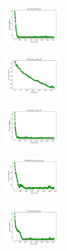 \begin{figure}[H]
    \centering
    \begin{subfigure}
        \centering
        \includegraphics[width=0.234\textwidth]{img/am10/iris_set_const_10_949004259_cost.png}
    \end{subfigure}
    \hfill
    \begin{subfigure}
        \centering
        \includegraphics[width=0.234\textwidth]{img/am10/ecoli_set_const_10_949004259_cost.png}
    \end{subfigure}
    \hfill
    \begin{subfigure}
        \centering
        \includegraphics[width=0.234\textwidth]{img/am10/rand_set_const_10_949004259_cost.png}
    \end{subfigure}
    \hfill
    \begin{subfigure}
        \centering
        \includegraphics[width=0.234\textwidth]{img/am10/newthyroid_set_const_10_949004259_cost.png}
    \end{subfigure}
    \hfill
    \begin{subfigure}
        \centering
        \includegraphics[width=0.234\textwidth]{img/am10/iris_set_const_10_589741062_cost.png}
    \end{subfigure}
    \hfill

\end{figure}
